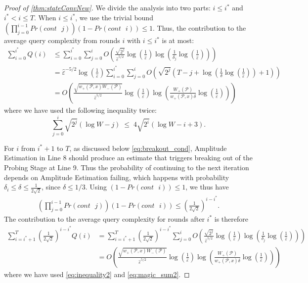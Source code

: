 \documentclass[cleveref, autoref, thm-restate,11pt]{article}
\theoremstyle{definition}
\renewcommand{\wp}[2]{{w_+({#1},{#2})}}
\newcommand{\PrCont}[1][i]{Pr(cont\textrm{ }#1)} %
\begin{document}
\begin{proof}[Proof of \cref{thm:stateConvNew}]
We divide the analysis into two parts: $i\leq i^*$ and $i^*<i\leq T$.
When $i \leq i^*$, we use the trivial bound $\left( \prod_{j=0}^{i-1} \PrCont[j] \right)\left(1-\PrCont[i]\right) \leq 1$.
Thus, the contribution to the average query complexity from rounds $i$ with $i \leq i^*$ is at most:
\begin{align}\label{eq:total_q_early}
    \sum_{i=0}^{i^*} Q(i)&\leq \sum_{i=0}^{i^*} \sum_{j=0}^iO\left(\frac{\sqrt{2^j
}}{\hat{\varepsilon}^{5/2}}\log\left(\frac{1}{\hat{\varepsilon}}\right) \log\left(\frac{1}{\delta_j}\log\left(\frac{1}{\hat{\varepsilon}}\right)\right)\right) \\\nonumber
&=\hat{\varepsilon}^{-5/2}\log\left(\frac{1}{\hat{\varepsilon}}\right)\sum_{i=0}^{i^*} \sum_{j=0}^i O\left(\sqrt{2^j}\left(T- j +\log\left(\frac{1}{\delta}\log\left(\frac{1}{\hat{\varepsilon}}\right)\right) +1\right)\right) \\\nonumber
    &=O\left(\frac{\sqrt{\wp{\mathscr P}{x}
W_-(\mathscr P)}}{\hat{\varepsilon}^{5/2}}\log\left(\frac{1}{\hat{\varepsilon}}\right)\log\left(\frac{W_+(\mathscr P)}{\wp{\mathscr P}{x}\delta}\log\left(\frac{1}{\hat{\varepsilon}}\right)\right)\right)
\end{align}
where we have used the following inequality twice:
\begin{equation}\label{eq:inequality2}
    \sum_{j=0}^i \sqrt{2^j}(\log W-j) \; \leq\;4\sqrt{2^i}(\log W-i+3).
\end{equation}



For $i $ from $i^*+1$ to $T$, as discussed below \cref{eq:breakout_cond}, Amplitude Estimation in Line 8 should
produce an estimate that triggers breaking out of the Probing Stage at Line 9. Thus the 
probability of continuing to the  next iteration depends on Amplitude Estimation failing, 
which happens with probability $\delta_i\leq \delta\leq\frac{1}{2\sqrt{2}}$, since $\delta\leq 1/3$. Using $(1-\PrCont[i])\leq 1$, we thus have
\begin{align}
\left( \prod_{j=0}^{i-1}\PrCont[j] \right)\left(1-\PrCont[i]\right)\leq \left(\frac{1}{2\sqrt{2}}\right)^{i-i^*}.
\end{align}
The contribution to the average query complexity for rounds after $i^*$ is therefore
\begin{align}\label{eq:total_Q_late}
    \sum_{i=i^*+1}^{T} \left(\frac{1}{2\sqrt{2}}\right)^{i-i^*}Q(i) 
    &= \sum_{i=i^*+1}^{T} \left(\frac{1}{2\sqrt{2}}\right)^{i-i^*} \sum_{j=0}^i 
    O\left(\frac{\sqrt{2^j}}{\hat{\varepsilon}^{5/2}}\log\left(\frac{1}{\hat{\varepsilon}}\right)
    \log\left(\frac{1}{\delta_j}\log\left(\frac{1}{\hat{\varepsilon}}\right)\right)\right)\nonumber \\
&= O\left(\frac{\sqrt{\wp{\mathscr P}{x}
W_-(\mathscr P)}}{\hat{\varepsilon}^{5/2}}\log\left(\frac{1}{\hat{\varepsilon}}\right)\log\left(\frac{W_+(\mathscr P)}{\wp{\mathscr P}{x}\delta}\log\left(\frac{1}{\hat{\varepsilon}}\right)\right)\right)
\end{align}
where we have used \cref{eq:inequality2} and \cref{eq:magic_sum2}. 


\end{proof}
\end{document}
